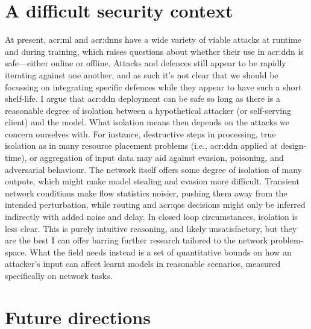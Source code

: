 \section{A difficult security context}
At present, \gls{acr:ml} and \glspl{acr:dnn} have a wide variety of viable attacks at runtime and during training, which raises questions about whether their use in \gls{acr:ddn} is safe---either online or offline.
Attacks and defences still appear to be rapidly iterating against one another, and as such it's not clear that we should be focussing on integrating specific defences while they appear to have such a short shelf-life.
I argue that \gls{acr:ddn} deployment can be safe so long as there is a reasonable degree of isolation between a hypothetical attacker (or self-serving client) and the model.
What isolation means then depends on the attacks we concern ourselves with.
For instance, destructive steps in processing, true isolation as in many resource placement problems (i.e., \gls{acr:ddn} applied at design-time), or aggregation of input data may aid against evasion, poisoning, and adversarial behaviour.
The network itself offers some degree of isolation of many outputs, which might make model stealing and evasion more difficult.
Transient network conditions make flow statistics noisier, pushing them away from the intended perturbation, while routing and \gls{acr:qos} decisions might only be inferred indirectly with added noise and delay.
In closed loop circumstances, isolation is less clear.
This is purely intuitive reasoning, and likely unsatisfactory, but they are the best I can offer barring further research tailored to the network problem-space.
What the field needs instead is a set of quantitative bounds on how an attacker's input can affect learnt models in reasonable scenarios, measured specifically on network tasks.

%
%

\section{Future directions}

